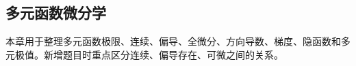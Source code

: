 \subsection{多元函数微分学}

\begin{knowledgeBox}
本章用于整理多元函数极限、连续、偏导、全微分、方向导数、梯度、隐函数和多元极值。新增题目时重点区分连续、偏导存在、可微之间的关系。
\end{knowledgeBox}
